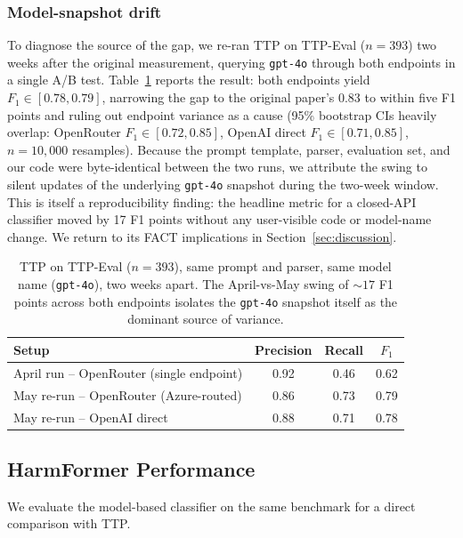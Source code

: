 \documentclass[10pt]{article} %
\begin{document}
\subsubsection{Model-snapshot drift}
\label{sec:model-drift}
To diagnose the source of the gap, we re-ran TTP on TTP-Eval ($n=393$) two weeks after the original measurement, querying \texttt{gpt-4o} through both endpoints in a single A/B test. Table~\ref{tab:ttp-ab-drift} reports the result: both endpoints yield $F_1 \in [0.78, 0.79]$, narrowing the gap to the original paper's 0.83 to within five F1 points and ruling out endpoint variance as a cause (95\% bootstrap CIs heavily overlap: OpenRouter $F_1 \in [0.72, 0.85]$, OpenAI direct $F_1 \in [0.71, 0.85]$, $n=10{,}000$ resamples). Because the prompt template, parser, evaluation set, and our code were byte-identical between the two runs, we attribute the swing to silent updates of the underlying \texttt{gpt-4o} snapshot during the two-week window. This is itself a reproducibility finding: the headline metric for a closed-API classifier moved by 17 F1 points without any user-visible code or model-name change. We return to its FACT implications in Section~\ref{sec:discussion}.

\begin{table}[H]
\centering
\begin{tabular}{lccc}
\hline
Setup & Precision & Recall & $F_1$ \\
\hline
April run -- OpenRouter (single endpoint)   & 0.92 & 0.46 & 0.62 \\
May re-run -- OpenRouter (Azure-routed)      & 0.86 & 0.73 & 0.79 \\
May re-run -- OpenAI direct                  & 0.88 & 0.71 & 0.78 \\
\hline
\end{tabular}
\caption{TTP on TTP-Eval ($n=393$), same prompt and parser, same model name (\texttt{gpt-4o}), two weeks apart. The April-vs-May swing of ${\sim}17$ F1 points across both endpoints isolates the \texttt{gpt-4o} snapshot itself as the dominant source of variance.}
\label{tab:ttp-ab-drift}
\end{table}

\subsection{HarmFormer Performance}
We evaluate the model-based classifier on the same benchmark for a direct comparison with TTP.
\end{document}
